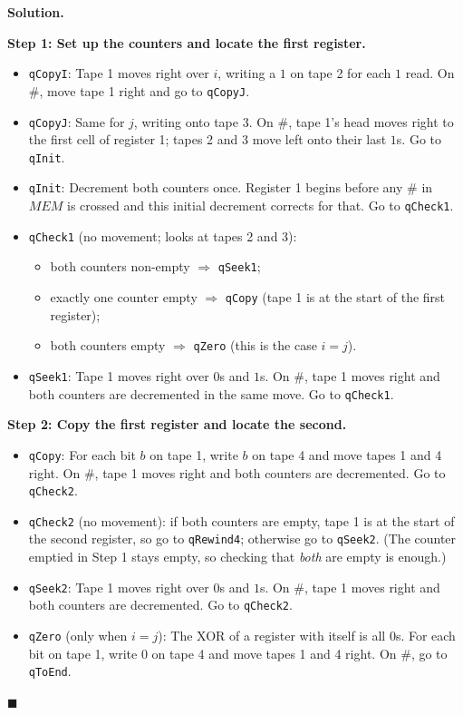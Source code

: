 \documentclass[11pt]{article}
\newenvironment{solution}{%
  \par\noindent\textbf{Solution.}\ \normalfont
}{\hfill$\blacksquare$\par\medskip}
\theoremstyle{plain}
\theoremstyle{definition}
\begin{document}
\begin{solution}
\vspace{5 pt}
\textbf{Step 1: Set up the counters and locate the first register.}
\begin{itemize}
  \item \texttt{qCopyI}: Tape 1 moves right over $i$, writing a $1$ on tape 2 for each $1$ read. On $\#$, move tape 1 right and go to \texttt{qCopyJ}.
  \item \texttt{qCopyJ}: Same for $j$, writing onto tape 3. On $\#$, tape 1's head moves right to the first cell of register 1; tapes 2 and 3 move left onto their last $1$s. Go to \texttt{qInit}.
  \item \texttt{qInit}: Decrement both counters once. Register 1 begins before any $\#$ in $\mathit{MEM}$ is crossed and this initial decrement corrects for that. Go to \texttt{qCheck1}.
  \item \texttt{qCheck1} (no movement; looks at tapes 2 and 3):
    \begin{itemize}
      \item both counters non-empty $\Rightarrow$ \texttt{qSeek1};
      \item exactly one counter empty $\Rightarrow$ \texttt{qCopy} (tape 1 is at the start of the first register);
      \item both counters empty $\Rightarrow$ \texttt{qZero} (this is the case $i = j$).
    \end{itemize}
  \item \texttt{qSeek1}: Tape 1 moves right over $0$s and $1$s. On $\#$, tape 1 moves right and both counters are decremented in the same move. Go to \texttt{qCheck1}.
\end{itemize}

\textbf{Step 2: Copy the first register and locate the second.}
\begin{itemize}
  \item \texttt{qCopy}: For each bit $b$ on tape 1, write $b$ on tape 4 and move tapes 1 and 4 right. On $\#$, tape 1 moves right and both counters are decremented. Go to \texttt{qCheck2}.
  \item \texttt{qCheck2} (no movement): if both counters are empty, tape 1 is at the start of the second register, so go to \texttt{qRewind4}; otherwise go to \texttt{qSeek2}. (The counter emptied in Step 1 stays empty, so checking that \emph{both} are empty is enough.)
  \item \texttt{qSeek2}: Tape 1 moves right over $0$s and $1$s. On $\#$, tape 1 moves right and both counters are decremented. Go to \texttt{qCheck2}.
  \item \texttt{qZero} (only when $i = j$): The XOR of a register with itself is all $0$s. For each bit on tape 1, write $0$ on tape 4 and move tapes 1 and 4 right. On $\#$, go to \texttt{qToEnd}.
\end{itemize}


\end{solution}
\end{document}
